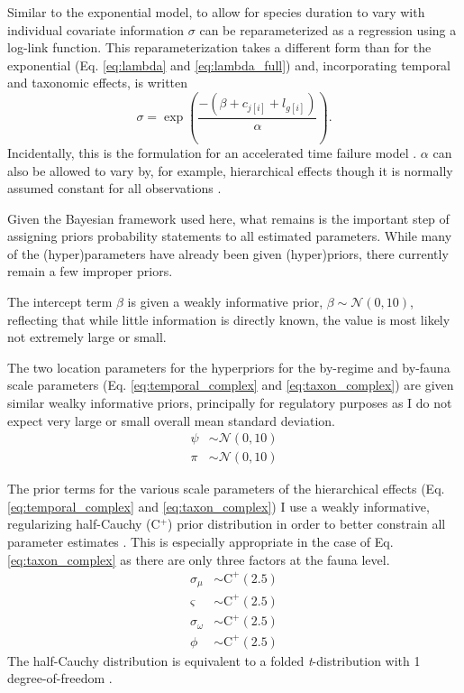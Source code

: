 \documentclass[12pt,letterpaper]{article}
\begin{document}
Similar to the exponential model, to allow for species duration to vary with individual covariate information \(\sigma\) can be reparameterized as a regression \citep{Klein2003} using a log-link function. This reparameterization takes a different form than for the exponential (Eq. \ref{eq:lambda} and \ref{eq:lambda_full}) and, incorporating temporal and taxonomic effects, is written
\begin{equation}
  \sigma = \exp\left(\frac{-(\beta + c_{j[i]} + l_{g[i]})}{\alpha}\right).
  \label{eq:sigma_full}
\end{equation}
Incidentally, this is the formulation for an accelerated time failure model \citep{Klein2003}. \(\alpha\) can also be allowed to vary by, for example, hierarchical effects though it is normally assumed constant for all observations \citep{Klein2003}.


Given the Bayesian framework used here, what remains is the important step of assigning priors probability statements to all estimated parameters. While many of the (hyper)parameters have already been given (hyper)priors, there currently remain a few improper priors.

The intercept term \(\beta\) is given a weakly informative prior, \(\beta \sim \mathcal{N}(0, 10)\), reflecting that while little information is directly known, the value is most likely not extremely large or small.

The two location parameters for the hyperpriors for the by-regime and by-fauna scale parameters (Eq. \ref{eq:temporal_complex} and \ref{eq:taxon_complex}) are given similar wealky informative priors, principally for regulatory purposes as I do not expect very large or small overall mean standard deviation.
\begin{equation}
  \begin{aligned}
    \psi &\sim \mathcal{N}(0, 10) \\
    \pi &\sim \mathcal{N}(0, 10) 
  \end{aligned}
  \label{eq:location_priors}
\end{equation}

The prior terms for the various scale parameters of the hierarchical effects (Eq. \ref{eq:temporal_complex} and \ref{eq:taxon_complex}) I use a weakly informative, regularizing half-Cauchy (C\(^{+}\)) prior distribution in order to better constrain all parameter estimates \citep{Gelman2013d}. This is especially appropriate in the case of Eq. \ref{eq:taxon_complex} as there are only three factors at the fauna level. 
\begin{equation}
  \begin{aligned}
    \sigma_{\mu} &\sim \mathrm{C}^{+}(2.5) \\
    \varsigma &\sim \mathrm{C}^{+}(2.5) \\
    \sigma_{\omega} &\sim \mathrm{C}^{+}(2.5) \\
    \phi &\sim \mathrm{C}^{+}(2.5)
  \end{aligned}
  \label{eq:scale_priors}
\end{equation}
The half-Cauchy distribution is equivalent to a folded \textit{t}-distribution with 1 degree-of-freedom \citep{Gelman2013d}.
\end{document}

